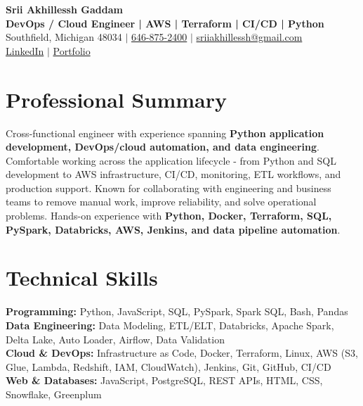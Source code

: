 \documentclass[letterpaper,10pt]{article}
\begin{document}
\fontsize{9.35pt}{10.45pt}\selectfont

\begin{center}
    {\LARGE \textbf{Srii Akhillessh Gaddam}} \\[-1pt]
    \textbf{DevOps / Cloud Engineer | AWS | Terraform | CI/CD | Python} \\[2pt]
    Southfield, Michigan 48034 $|$
    \href{tel:6468752400}{646-875-2400} $|$
    \href{mailto:sriiakhillessh@gmail.com}{sriiakhillessh@gmail.com} \\[1pt]
    \href{https://www.linkedin.com/in/srii-akhiilessh-gaddam-b48668191/}{LinkedIn} $|$
    \href{https://sriiakhillesshg.github.io/portfolio/}{Portfolio}
\end{center}
\vspace{-8pt}

\section{Professional Summary}
\small{Cross-functional engineer with experience spanning \textbf{Python application development, DevOps/cloud automation, and data engineering}. Comfortable working across the application lifecycle - from Python and SQL development to AWS infrastructure, CI/CD, monitoring, ETL workflows, and production support. Known for collaborating with engineering and business teams to remove manual work, improve reliability, and solve operational problems. Hands-on experience with \textbf{Python, Docker, Terraform, SQL, PySpark, Databricks, AWS, Jenkins, and data pipeline automation}.}

\section{Technical Skills}
\small{
\textbf{Programming:} Python, JavaScript, SQL, PySpark, Spark SQL, Bash, Pandas \\
\textbf{Data Engineering:} Data Modeling, ETL/ELT, Databricks, Apache Spark, Delta Lake, Auto Loader, Airflow, Data Validation \\
\textbf{Cloud \& DevOps:} Infrastructure as Code, Docker, Terraform, Linux, AWS (S3, Glue, Lambda, Redshift, IAM, CloudWatch), Jenkins, Git, GitHub, CI/CD \\
\textbf{Web \& Databases:} JavaScript, PostgreSQL, REST APIs, HTML, CSS, Snowflake, Greenplum
}
\end{document}
